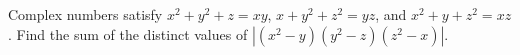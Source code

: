 Complex numbers satisfy $x^2+y^2+z=xy$, $x+y^2+z^2=yz$, and $x^2+y+z^2=xz$. Find the sum of the distinct values of $|(x^2-y)(y^2-z)(z^2-x)|$.
